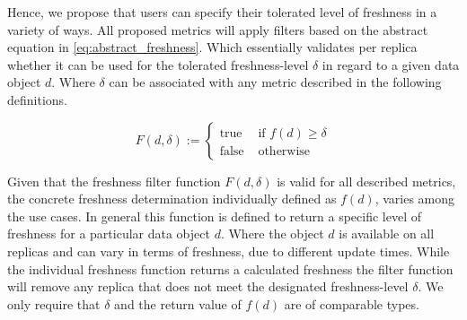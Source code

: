 Hence, we propose that users can specify their tolerated level of freshness in a variety of ways. 
All proposed metrics will apply filters based on the abstract equation in \ref{eq:abstract_freshness}. 
Which essentially validates per replica whether it can be used for the tolerated freshness-level $\delta$ in regard to a given data object $d$.
Where $\delta$ can be associated with any metric described in the following definitions.

\begin{equation} \label{eq:abstract_freshness}
    F(d, \delta) :=
        \begin{cases}
            \text{true } & \text{if } f(d) \geq \delta\\
            \text{false } & \text{otherwise }
        \end{cases}
\end{equation}


Given that the freshness filter function $F(d, \delta)$ is valid for all described metrics, the concrete freshness determination individually defined as $f(d)$, 
varies among the use cases.
In general this function is defined to return a specific level of freshness for a particular data object $d$. 
Where the object $d$ is available on all replicas and can vary in terms of freshness, due to different update times.
While the individual freshness function returns a calculated freshness the filter function will remove any replica that does not meet the designated freshness-level $\delta$. 
We only require that $\delta$ and the return value of $f(d)$ are of comparable types.


